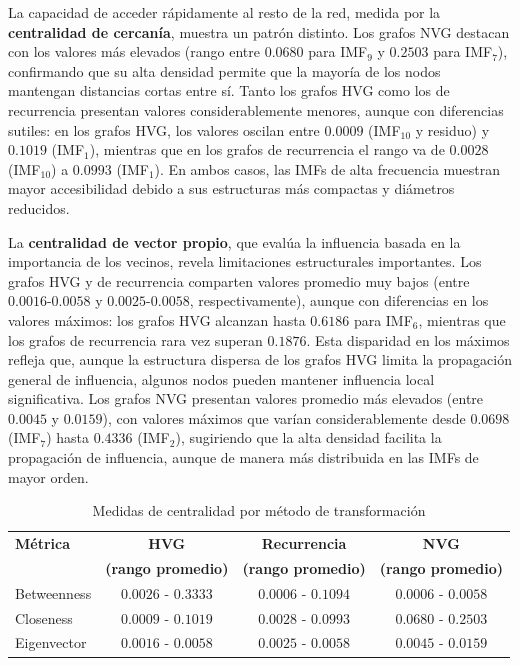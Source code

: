 \documentclass[11pt,a4paper]{article}
\begin{document}
La capacidad de acceder rápidamente al resto de la red, medida por la \textbf{centralidad de cercanía}, muestra un patrón distinto. Los grafos NVG destacan con los valores más elevados (rango entre $0.0680$ para IMF$_9$ y $0.2503$ para IMF$_7$), confirmando que su alta densidad permite que la mayoría de los nodos mantengan distancias cortas entre sí. Tanto los grafos HVG como los de recurrencia presentan valores considerablemente menores, aunque con diferencias sutiles: en los grafos HVG, los valores oscilan entre $0.0009$ (IMF$_{10}$ y residuo) y $0.1019$ (IMF$_1$), mientras que en los grafos de recurrencia el rango va de $0.0028$ (IMF$_{10}$) a $0.0993$ (IMF$_1$). En ambos casos, las IMFs de alta frecuencia muestran mayor accesibilidad debido a sus estructuras más compactas y diámetros reducidos.

La \textbf{centralidad de vector propio}, que evalúa la influencia basada en la importancia de los vecinos, revela limitaciones estructurales importantes. Los grafos HVG y de recurrencia comparten valores promedio muy bajos (entre $0.0016$-$0.0058$ y $0.0025$-$0.0058$, respectivamente), aunque con diferencias en los valores máximos: los grafos HVG alcanzan hasta $0.6186$ para IMF$_6$, mientras que los grafos de recurrencia rara vez superan $0.1876$. Esta disparidad en los máximos refleja que, aunque la estructura dispersa de los grafos HVG limita la propagación general de influencia, algunos nodos pueden mantener influencia local significativa. Los grafos NVG presentan valores promedio más elevados (entre $0.0045$ y $0.0159$), con valores máximos que varían considerablemente desde $0.0698$ (IMF$_7$) hasta $0.4336$ (IMF$_2$), sugiriendo que la alta densidad facilita la propagación de influencia, aunque de manera más distribuida en las IMFs de mayor orden.

\begin{table}[h]
\centering
\caption{Medidas de centralidad por método de transformación}
\label{tab:centralidad}
\small
\begin{tabular}{lccc}
\toprule
\textbf{Métrica} & \textbf{HVG} & \textbf{Recurrencia} & \textbf{NVG} \\
 & \textbf{(rango promedio)} & \textbf{(rango promedio)} & \textbf{(rango promedio)} \\
\midrule
Betweenness & $0.0026$ - $0.3333$ & $0.0006$ - $0.1094$ & $0.0006$ - $0.0058$ \\
Closeness & $0.0009$ - $0.1019$ & $0.0028$ - $0.0993$ & $0.0680$ - $0.2503$ \\
Eigenvector & $0.0016$ - $0.0058$ & $0.0025$ - $0.0058$ & $0.0045$ - $0.0159$ \\
\bottomrule
\end{tabular}
\end{table}
\end{document}
